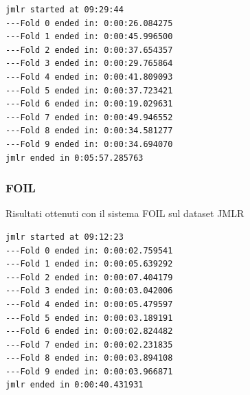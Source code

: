 \begin{verbatim}
jmlr started at 09:29:44
---Fold 0 ended in: 0:00:26.084275
---Fold 1 ended in: 0:00:45.996500
---Fold 2 ended in: 0:00:37.654357
---Fold 3 ended in: 0:00:29.765864
---Fold 4 ended in: 0:00:41.809093
---Fold 5 ended in: 0:00:37.723421
---Fold 6 ended in: 0:00:19.029631
---Fold 7 ended in: 0:00:49.946552
---Fold 8 ended in: 0:00:34.581277
---Fold 9 ended in: 0:00:34.694070
jmlr ended in 0:05:57.285763
\end{verbatim}

\subsubsection{FOIL}
\begin{table}[H]
\caption[Risultati FOIL-JMLR]{Risultati ottenuti con il sistema FOIL sul dataset JMLR}
\label{tab:ris:foil:jmlr}
\end{table}

\begin{verbatim}
jmlr started at 09:12:23
---Fold 0 ended in: 0:00:02.759541
---Fold 1 ended in: 0:00:05.639292
---Fold 2 ended in: 0:00:07.404179
---Fold 3 ended in: 0:00:03.042006
---Fold 4 ended in: 0:00:05.479597
---Fold 5 ended in: 0:00:03.189191
---Fold 6 ended in: 0:00:02.824482
---Fold 7 ended in: 0:00:02.231835
---Fold 8 ended in: 0:00:03.894108
---Fold 9 ended in: 0:00:03.966871
jmlr ended in 0:00:40.431931
\end{verbatim}


